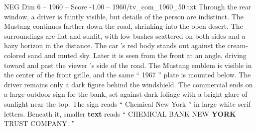 \begin{textsample}{NEG Dim 6 – 1960 – Score -1.00 – 1960/tv\_com\_1960\_50.txt}
Through the rear window, a driver is faintly visible, but details of the person are indistinct.
The Mustang continues farther down the road, shrinking into the open desert.
The surroundings are flat and sunlit, with low bushes scattered on both sides and a hazy horizon in the distance.
The car ’s red body stands out against the cream-colored sand and muted sky.
Later it is seen from the front at an angle, driving toward and past the viewer ’s side of the road.
The Mustang emblem is visible in the center of the front grille, and the same “ 1967 ” plate is mounted below.
The driver remains only a dark figure behind the windshield.
The commercial ends on a large outdoor sign for the bank, set against dark foliage with a bright glare of sunlight near the top.
The sign reads “ Chemical New York ” in large white serif letters.
Beneath it, smaller \textbf{text} reads “ CHEMICAL BANK NEW \textbf{YORK} TRUST COMPANY. ”

\end{textsample}
